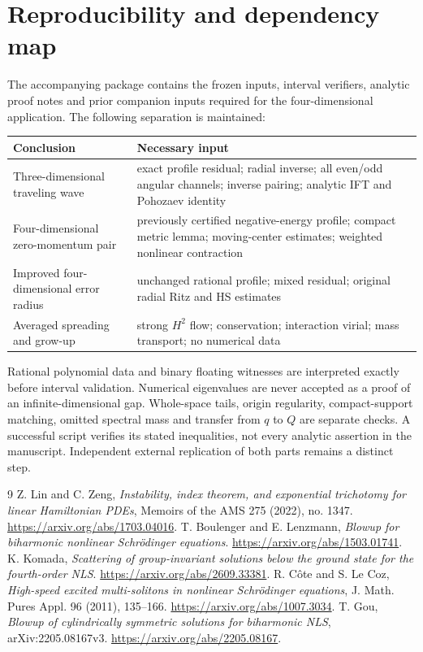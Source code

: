 \documentclass[11pt,a4paper]{article}
\theoremstyle{remark}\newtheorem{remark}[theorem]{Remark}
\begin{document}
\section{Reproducibility and dependency map}
The accompanying package contains the frozen inputs, interval verifiers, analytic proof notes and prior companion inputs required for the four-dimensional application. The following separation is maintained:
\begin{center}
\begin{tabular}{@{}>{\raggedright\arraybackslash}p{}>{\raggedright\arraybackslash}p{}@{}}\toprule
Conclusion & Necessary input \\\midrule
Three-dimensional traveling wave & exact profile residual; radial inverse; all even/odd angular channels; inverse pairing; analytic IFT and Pohozaev identity \\
Four-dimensional zero-momentum pair & previously certified negative-energy profile; compact metric lemma; moving-center estimates; weighted nonlinear contraction \\
Improved four-dimensional error radius & unchanged rational profile; mixed residual; original radial Ritz and HS estimates \\
Averaged spreading and grow-up & strong $H^2$ flow; conservation; interaction virial; mass transport; no numerical data \\\bottomrule
\end{tabular}
\end{center}
Rational polynomial data and binary floating witnesses are interpreted exactly before interval validation. Numerical eigenvalues are never accepted as a proof of an infinite-dimensional gap. Whole-space tails, origin regularity, compact-support matching, omitted spectral mass and transfer from $q$ to $Q$ are separate checks. A successful script verifies its stated inequalities, not every analytic assertion in the manuscript. Independent external replication of both parts remains a distinct step.

\begin{thebibliography}{9}
\small\setlength{\itemsep}{2pt}\setlength{\parskip}{0pt}
 Z. Lin and C. Zeng, \emph{Instability, index theorem, and exponential trichotomy for linear Hamiltonian PDEs}, Memoirs of the AMS 275 (2022), no. 1347. \url{https://arxiv.org/abs/1703.04016}.
 T. Boulenger and E. Lenzmann, \emph{Blowup for biharmonic nonlinear Schr\"odinger equations}. \url{https://arxiv.org/abs/1503.01741}.
 K. Komada, \emph{Scattering of group-invariant solutions below the ground state for the fourth-order NLS}. \url{https://arxiv.org/abs/2609.33381}.
 R. C\^ote and S. Le Coz, \emph{High-speed excited multi-solitons in nonlinear Schr\"odinger equations}, J. Math. Pures Appl. 96 (2011), 135--166. \url{https://arxiv.org/abs/1007.3034}.
 T. Gou, \emph{Blowup of cylindrically symmetric solutions for biharmonic NLS}, arXiv:2205.08167v3. \url{https://arxiv.org/abs/2205.08167}.
\end{thebibliography}
\end{document}
